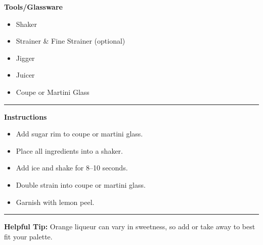 \hspace{.01\textwidth}\vrule\hspace{.01\textwidth}
\begin{minipage}[t]{.49\textwidth}
    \noindent
    \textbf{\large Tools/Glassware}
    \begin{itemize}
        \item Shaker
        \item Strainer \& Fine Strainer (optional)
        \item Jigger
        \item Juicer
        \item Coupe or Martini Glass
    \end{itemize}
\end{minipage}
\vspace{.5em}\hrule\vspace{.5em}
\noindent
\begin{minipage}{\textwidth}
    \noindent
    \textbf{\large Instructions}
    \begin{itemize}
        \item Add sugar rim to coupe or martini glass.
        \item Place all ingredients into a shaker.
        \item Add ice and shake for 8--10 seconds.
        \item Double strain into coupe or martini glass.
        \item Garnish with lemon peel.
    \end{itemize}
\end{minipage}
\vspace{.5em}\hrule\vspace{.5em}
\noindent
\textbf{\large Helpful Tip:} Orange liqueur can vary in sweetness, so add or take away to best fit your palette.
\newpage
